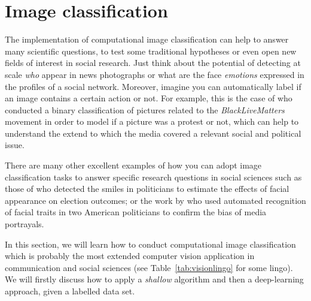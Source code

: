 \section{Image classification}
\label{sec:cnn}

The implementation of computational image classification can help to answer many scientific questions, to test some traditional hypotheses or even open new fields of interest in social research. Just think about the potential of detecting at scale \textit{who} appear in news photographs or what are the face \textit{emotions} expressed in the profiles of a social network. Moreover, imagine you can automatically label if an image contains a certain action or not. For example, this is the case of \citet{williams2020images} who conducted a binary classification of pictures related to the \textit{BlackLiveMatters} movement in order to model if a picture was a protest or not, which can help to understand the extend to which the media covered a relevant social and political issue.

There are many other excellent examples of how you can adopt image classification tasks to answer specific research questions in social sciences such as those of \citet{horiuchi2012should} who detected the smiles in politicians to estimate the effects of facial appearance on election outcomes; or the work by \citet{peng2018same} who used automated recognition of facial traits in two American politicians to confirm the bias of media portrayals.

In this section, we will learn how to conduct computational image classification which is probably the most extended computer vision application in communication and social sciences (see Table~\ref{tab:visionlingo} for some lingo). We will firstly discuss how to apply a \textit{shallow} algorithm and then a deep-learning approach, given a labelled data set. 	

